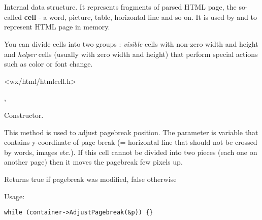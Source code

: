 %
%

\section{}\label{wxhtmlcell}

Internal data structure. It represents fragments of parsed HTML
page, the so-called {\bf cell} - a word, picture, table, horizontal line and so on.
It is used by  and 
 to represent HTML page in memory.

You can divide cells into two groups : {\it visible} cells with non-zero width and
height and {\it helper} cells (usually with zero width and height) that
perform special actions such as color or font change.




<wx/html/htmlcell.h>


,


\label{wxhtmlcellwxhtmlcell}


Constructor.

\label{wxhtmlcelladjustpagebreak}


This method is used to adjust pagebreak position. The parameter is
variable that contains y-coordinate of page break (= horizontal line that
should not be crossed by words, images etc.). If this cell cannot be divided
into two pieces (each one on another page) then it moves the pagebreak
few pixels up.

Returns true if pagebreak was modified, false otherwise

Usage: 
\begin{verbatim}
while (container->AdjustPagebreak(&p)) {}
\end{verbatim}

\label{wxhtmlcelldraw}

